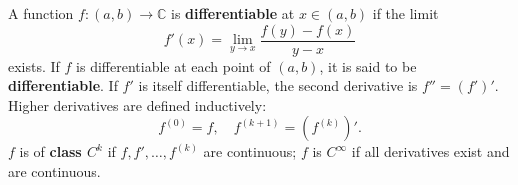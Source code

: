 A function $f: (a, b) \to \mathbb{C}$ is \textbf{differentiable} at $x \in (a, b)$ if the limit
$$f'(x) = \lim_{y \to x} \frac{f(y) - f(x)}{y - x}$$
exists. If $f$ is differentiable at each point of $(a, b)$, it is said to be \textbf{differentiable}. If $f'$ is itself differentiable, the second derivative is $f'' = (f')'$. Higher derivatives are defined inductively:
$$f^{(0)} = f, \quad f^{(k+1)} = (f^{(k)})'.$$
$f$ is of \textbf{class $C^k$} if $f, f', \ldots, f^{(k)}$ are continuous; $f$ is \textbf{$C^\infty$} if all derivatives exist and are continuous.
